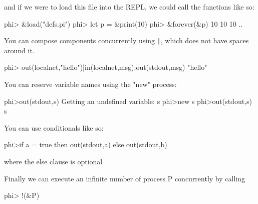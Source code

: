 and if we were to load this file into the REPL, we could call the functions like so:
\begin{code}
    phi> &load("defs.pi")
    phi> let p = &print(10)
    phi> &forever(&p)
    10
    10
    10
    ..
\end{code}

You can compose components concurrently using \verb!|!, which does not have spaces around it.
\begin{code}
    phi> out(localnet,"hello")|in(localnet,msg);out(stdout,msg)
    "hello"
\end{code}

You can reserve variable names using the "new" process:
\begin{code}
    phi>out(stdout,s)
    Getting an undefined variable: s
    phi>new s
    phi>out(stdout,s)
    s
\end{code}

You can use conditionals like so:
\begin{code}
    phi>if a = true then out(stdout,a) else out(stdout,b)
\end{code}
where the else clause is optional

Finally we can execute an infinite number of process P concurrently by calling 
\begin{code}
    phi> !(&P)
\end{code}
